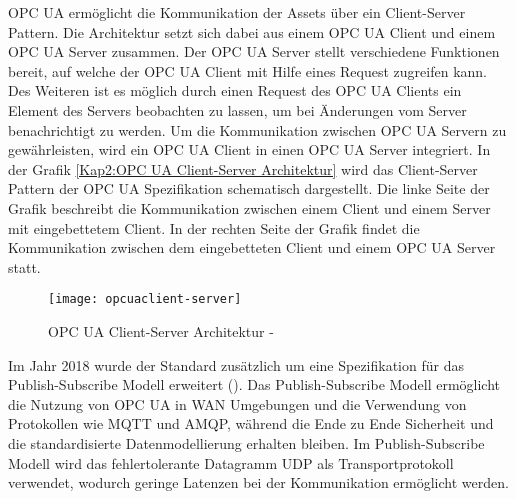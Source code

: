 \ac{OPC UA} ermöglicht die Kommunikation der Assets über ein Client-Server Pattern. Die Architektur setzt sich dabei aus einem \ac{OPC UA} Client und einem \ac{OPC UA} Server zusammen. Der \ac{OPC UA} Server stellt verschiedene Funktionen bereit, auf welche der \ac{OPC UA} Client mit Hilfe eines Request zugreifen kann. Des Weiteren ist es möglich durch einen Request des \ac{OPC UA} Clients ein Element des Servers beobachten zu lassen, um bei Änderungen vom Server benachrichtigt zu werden. Um die Kommunikation zwischen \ac{OPC UA} Servern zu gewährleisten, wird ein \ac{OPC UA} Client in einen \ac{OPC UA} Server integriert. In der Grafik \autoref{Kap2:OPC UA Client-Server Architektur} wird das Client-Server Pattern der \ac{OPC UA} Spezifikation schematisch dargestellt. Die linke Seite der Grafik beschreibt die Kommunikation zwischen einem Client und einem Server mit eingebettetem Client. In der rechten Seite der Grafik findet die Kommunikation zwischen dem eingebetteten Client und einem \ac{OPC UA} Server statt.

\begin{figure}[h]
  \centering
  \texttt{[image: opcuaclient-server]}
  \caption{OPC UA Client-Server Architektur - \cite{opcpt1}} 
  \label{Kap2:OPC UA Client-Server Architektur}
\end{figure}

\clearpage

Im Jahr 2018 wurde der Standard zusätzlich um eine Spezifikation für das Publish-Subscribe Modell erweitert (\cite{hoppe2018}). Das Publish-Subscribe Modell ermöglicht die Nutzung von \ac{OPC UA} in \ac{WAN} Umgebungen und die Verwendung von Protokollen wie \ac{MQTT} und \ac{AMQP}, während die Ende zu Ende Sicherheit und die standardisierte Datenmodellierung erhalten bleiben. Im Publish-Subscribe Modell wird das fehlertolerante Datagramm \ac{UDP} als Transportprotokoll verwendet, wodurch geringe Latenzen bei der Kommunikation ermöglicht werden.

